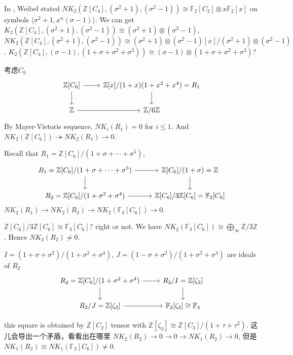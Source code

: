 In \cite{weibel2009nk0}, Weibel stated $NK_2(\mathbb{Z}[C_4],(\sigma^2+1),(\sigma^2-1))\cong \mathbb{F}_2[C_2]\otimes x \mathbb{F}_2[x]$ on symbols $\langle \sigma^2+1,x^n(\sigma-1)\rangle$. We can get $K_2(\mathbb{Z}[C_4],(\sigma^2+1),(\sigma^2-1))\cong (\sigma^2+1)\otimes(\sigma^2-1)$, $NK_2(\mathbb{Z}[C_4],(\sigma^2+1),(\sigma^2-1))\cong (\sigma^2+1)\otimes(\sigma^2-1)[x]/(\sigma^2+1)\otimes(\sigma^2-1)$. $K_2(\mathbb{Z}[C_4],(\sigma-1),(1+\sigma+\sigma^2+\sigma^3))\cong (\sigma-1)\otimes(1+\sigma+\sigma^2+\sigma^3)$?



考虑$C_6$
\[\begin{tikzcd}
		\mathbb{Z}[C_6] \ar[r] \ar[d]& \mathbb{Z}[x]/(1+x)(1+x^2+x^4)=R_1\ar[d]\\
		 \mathbb{Z}\ar[r] & \mathbb{Z}/6\mathbb{Z}
	\end{tikzcd}\]
By Mayer-Vietoris sequence, $NK_i(R_1)=0$ for $i\leq 1$. And $NK_2(\mathbb{Z}[C_6]) \twoheadrightarrow NK_2(R_1)\longrightarrow 0$.

Recall that $R_1=\mathbb{Z}[C_6]/(1+\sigma+\cdots+\sigma^5)$,
\[\begin{tikzcd}
		R_1=\mathbb{Z}[C_6]/(1+\sigma+\cdots+\sigma^5) \ar[r] \ar[d]& \mathbb{Z}[C_6]/(1+\sigma)= \mathbb{Z}\ar[d]\\
		 R_2=\mathbb{Z}[C_6]/(1+\sigma^2+\sigma^4)\ar[r] & \mathbb{Z}[C_6]/3\mathbb{Z}[C_6]=\mathbb{F}_3[C_6]
	\end{tikzcd}\]
$NK_2(R_1)\longrightarrow NK_2(R_2)\longrightarrow NK_2(\mathbb{F}_3[C_6])\longrightarrow 0.$

$\mathbb{Z}[C_6]/3\mathbb{Z}[C_6]\cong \mathbb{F}_3[C_6]$? right or not. We have $NK_2(\mathbb{F}_3[C_6])\cong \bigoplus_{\infty} \mathbb{Z}/3\mathbb{Z}$. Hence $NK_2(R_2)\neq 0$.

$I=(1+\sigma+\sigma^2)/(1+\sigma^2+\sigma^4)$, $J=(1-\sigma+\sigma^2)/(1+\sigma^2+\sigma^4)$ are ideals of $R_2$
\[\begin{tikzcd}
		R_2=\mathbb{Z}[C_6]/(1+\sigma^2+\sigma^4)\ar[r] \ar[d]& R_2/I = \mathbb{Z}[\zeta_3]\ar[d]\\
		 R_2/J=\mathbb{Z}[\zeta_3] \ar[r] & \mathbb{F}_2[\zeta_3]\cong \mathbb{F}_{4}
	\end{tikzcd}\]

this square is obtained by $\mathbb{Z}[C_2]$ tensor with $\mathbb{Z}[\zeta_3]\cong \mathbb{Z}[C_3]/(1+\tau+\tau^2)$.
这儿会导出一个矛盾，看看出在哪里
$NK_2(R_2)\longrightarrow 0\longrightarrow 0 \longrightarrow NK_1(R_2)\longrightarrow 0$, 但是
$NK_1(R_2)\cong NK_1(\mathbb{F}_3[C_6])\neq 0$.


